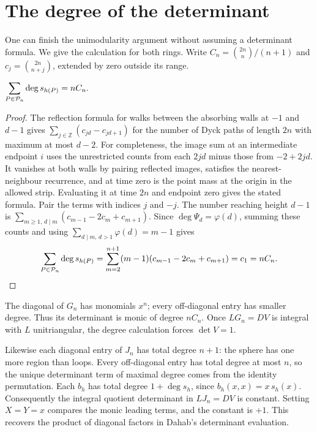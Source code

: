 \section{The degree of the determinant}
\label{sec:degree}
One can finish the unimodularity argument without assuming a determinant
formula. We give the calculation for both rings. Write
\(C_n=\binom{2n}{n}/(n+1)\) and \(c_j=\binom{2n}{n+j}\), extended by
zero outside its range.

\begin{lemma}
\(\displaystyle\sum_{P\in\mathcal P_n}\deg s_{h(P)}=nC_n.\)
\end{lemma}
\begin{proof}
The reflection formula for walks between the absorbing walls at
\(-1\) and \(d-1\) gives
\(\sum_{j\in\mathbb Z}(c_{jd}-c_{jd+1})\) for the number of
Dyck paths of length \(2n\) with maximum at most \(d-2\).
For completeness, the image sum at an intermediate endpoint \(i\)
uses the unrestricted counts from each \(2jd\) minus those from
\(-2+2jd\). It vanishes at both walls by pairing reflected images,
satisfies the nearest-neighbour recurrence, and at time zero is the
point mass at the origin in the allowed strip. Evaluating it at
time \(2n\) and endpoint zero gives the stated formula.
Pair the terms with indices \(j\) and \(-j\). The number reaching
height \(d-1\) is
\(\sum_{m\ge1,\,d\mid m}(c_{m-1}-2c_m+c_{m+1})\).
Since \(\deg\Psi_d=\varphi(d)\), summing these counts and using
\(\sum_{d\mid m,\,d>1}\varphi(d)=m-1\) gives
\[
 \sum_{P\in\mathcal P_n}\deg s_{h(P)}
 =\sum_{m=2}^{n+1}(m-1)(c_{m-1}-2c_m+c_{m+1})
 =c_1=nC_n.
\]
\end{proof}

The diagonal of \(G_n\) has monomials \(x^n\); every off-diagonal
entry has smaller degree. Thus its determinant is monic of degree
\(nC_n\). Once \(L G_n=D V\) is integral with \(L\) unitriangular,
the degree calculation forces \(\det V=1\).

Likewise each diagonal entry of \(J_n\) has total degree \(n+1\):
the sphere has one more region than loops. Every off-diagonal entry
has total degree at most \(n\), so the unique determinant term of
maximal degree comes from the identity permutation. Each \(b_h\)
has total degree \(1+\deg s_h\), since \(b_h(x,x)=x\,s_h(x)\).
Consequently the integral quotient determinant in \(LJ_n=DV\) is
constant. Setting \(X=Y=x\) compares the monic leading terms, and
the constant is \(+1\). This recovers the product of diagonal factors
in Dahab's determinant evaluation.
